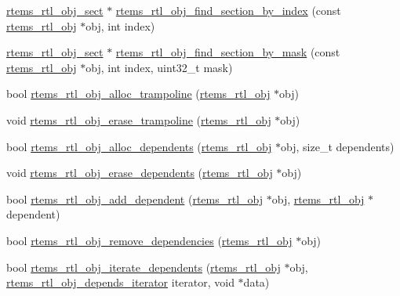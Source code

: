 \begin{DoxyCompactItemize}
\mbox{\hyperlink{structrtems__rtl__obj__sect}{rtems\+\_\+rtl\+\_\+obj\+\_\+sect}} $\ast$ \mbox{\hyperlink{rtl-obj_8h_ae3fee966abdcf542db13dfd3c75f8f1d}{rtems\+\_\+rtl\+\_\+obj\+\_\+find\+\_\+section\+\_\+by\+\_\+index}} (const \mbox{\hyperlink{structrtems__rtl__obj}{rtems\+\_\+rtl\+\_\+obj}} $\ast$obj, int index)
\item 
\mbox{\hyperlink{structrtems__rtl__obj__sect}{rtems\+\_\+rtl\+\_\+obj\+\_\+sect}} $\ast$ \mbox{\hyperlink{rtl-obj_8h_a99bc60fea183744d2e3553f517bc6d22}{rtems\+\_\+rtl\+\_\+obj\+\_\+find\+\_\+section\+\_\+by\+\_\+mask}} (const \mbox{\hyperlink{structrtems__rtl__obj}{rtems\+\_\+rtl\+\_\+obj}} $\ast$obj, int index, uint32\+\_\+t mask)
\item 
bool \mbox{\hyperlink{rtl-obj_8h_a825479a6a942b5b742d4e05d5e08ee81}{rtems\+\_\+rtl\+\_\+obj\+\_\+alloc\+\_\+trampoline}} (\mbox{\hyperlink{structrtems__rtl__obj}{rtems\+\_\+rtl\+\_\+obj}} $\ast$obj)
\item 
void \mbox{\hyperlink{rtl-obj_8h_a59b26b41ab6dacfe609d8c98c36e535a}{rtems\+\_\+rtl\+\_\+obj\+\_\+erase\+\_\+trampoline}} (\mbox{\hyperlink{structrtems__rtl__obj}{rtems\+\_\+rtl\+\_\+obj}} $\ast$obj)
\item 
bool \mbox{\hyperlink{rtl-obj_8h_a9877304c222a5c80f68936f814cb42b3}{rtems\+\_\+rtl\+\_\+obj\+\_\+alloc\+\_\+dependents}} (\mbox{\hyperlink{structrtems__rtl__obj}{rtems\+\_\+rtl\+\_\+obj}} $\ast$obj, size\+\_\+t dependents)
\item 
void \mbox{\hyperlink{rtl-obj_8h_aea8861e811c36196e95b439e33707484}{rtems\+\_\+rtl\+\_\+obj\+\_\+erase\+\_\+dependents}} (\mbox{\hyperlink{structrtems__rtl__obj}{rtems\+\_\+rtl\+\_\+obj}} $\ast$obj)
\item 
bool \mbox{\hyperlink{rtl-obj_8h_a4c2f2836262a4606efecf94f95ac0cd8}{rtems\+\_\+rtl\+\_\+obj\+\_\+add\+\_\+dependent}} (\mbox{\hyperlink{structrtems__rtl__obj}{rtems\+\_\+rtl\+\_\+obj}} $\ast$obj, \mbox{\hyperlink{structrtems__rtl__obj}{rtems\+\_\+rtl\+\_\+obj}} $\ast$dependent)
\item 
bool \mbox{\hyperlink{rtl-obj_8h_a6191736c9a9c8e4a585f2208838ba277}{rtems\+\_\+rtl\+\_\+obj\+\_\+remove\+\_\+dependencies}} (\mbox{\hyperlink{structrtems__rtl__obj}{rtems\+\_\+rtl\+\_\+obj}} $\ast$obj)
\item 
bool \mbox{\hyperlink{rtl-obj_8h_afeed317d7aadd6e3fcb4b86cf31dc270}{rtems\+\_\+rtl\+\_\+obj\+\_\+iterate\+\_\+dependents}} (\mbox{\hyperlink{structrtems__rtl__obj}{rtems\+\_\+rtl\+\_\+obj}} $\ast$obj, \mbox{\hyperlink{rtl-obj_8h_a1465c9202902dfd2416e1d1432dab052}{rtems\+\_\+rtl\+\_\+obj\+\_\+depends\+\_\+iterator}} iterator, void $\ast$data)

\end{DoxyCompactItemize}
